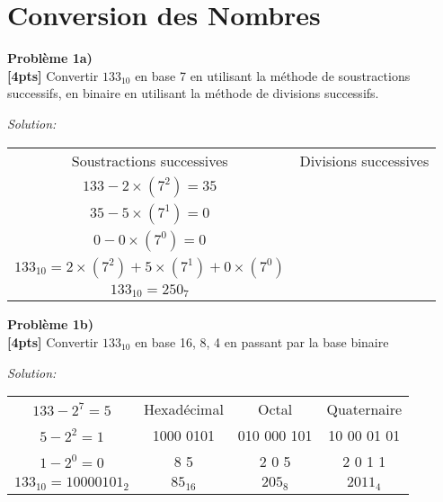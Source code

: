 \documentclass{article}
\newenvironment{problem}[2][Problème]
    { \begin{mdframed}[backgroundcolor=gray!20] \textbf{#1 #2} \\}
    {  \end{mdframed}}
\newenvironment{solution}
    {\textit{Solution:}}
    {}
\begin{document}
\section{Conversion des Nombres}

\begin{problem}{1a)}
\textbf{[4pts]} Convertir $133_{10}$ en base 7 en utilisant la méthode de soustractions successifs, en binaire en utilisant la méthode de divisions successifs.
\end{problem}
\begin{solution}
    \begin{tabular}{c|c}
        Soustractions successives & Divisions successives\\
        $133 - 2\times(7^2) = 35$ & \\
        $35 - 5\times(7^1) = 0$ & \\
        $0 - 0\times(7^0) = 0$ & \\
        $133_{10} = 2\times(7^2) + 5\times(7^1) + 0\times(7^0)$ & \\
        $133_{10} = 250_7$ & 
    \end{tabular}
\end{solution}

\begin{problem}{1b)}
\textbf{[4pts]} Convertir $133_{10}$ en base 16, 8, 4 en passant par la base binaire
\end{problem}
\begin{solution}
    \begin{tabular}{cc|c|c}
    $133-2^7=5$ & Hexadécimal & Octal & Quaternaire\\
    $5-2^2 = 1$ & 1000 0101 & 010 000 101 & 10 00 01 01\\
    $1-2^0 = 0$ & 8 \hspace{14pt} 5 & 2 \hspace{6pt} 0 \hspace{6pt} 5 & 2 \hspace{4pt}0 \hspace{4pt}1 \hspace{4pt}1\\
    $133_{10} = 1000 0101_2$ & $85_{16}$ & $205_8$ & $2011_4$
    \end{tabular}
\end{solution}
\end{document}

